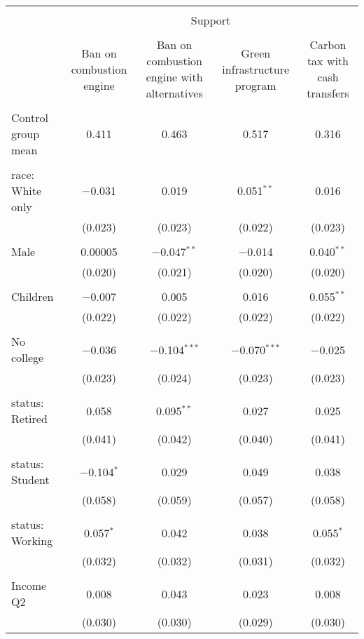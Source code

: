 
\begin{tabular}{@{\extracolsep{5pt}}lcccc} 
\\[-1.8ex]\hline 
\hline \\[-1.8ex] 
 & \multicolumn{4}{c}{Support} \\ 
\cline{2-5} 
\\[-1.8ex] & Ban on combustion engine & Ban on combustion engine with alternatives & Green infrastructure program & Carbon tax with cash transfers \\ 
\hline \\[-1.8ex] 
 Control group mean & 0.411 & 0.463 & 0.517 & 0.316  \\ \hline \\[-1.8ex] race: White only & $-$0.031 & 0.019 & 0.051$^{**}$ & 0.016 \\ 
  & (0.023) & (0.023) & (0.022) & (0.023) \\ 
  & & & & \\ 
 Male & 0.00005 & $-$0.047$^{**}$ & $-$0.014 & 0.040$^{**}$ \\ 
  & (0.020) & (0.021) & (0.020) & (0.020) \\ 
  & & & & \\ 
 Children & $-$0.007 & 0.005 & 0.016 & 0.055$^{**}$ \\ 
  & (0.022) & (0.022) & (0.022) & (0.022) \\ 
  & & & & \\ 
 No college & $-$0.036 & $-$0.104$^{***}$ & $-$0.070$^{***}$ & $-$0.025 \\ 
  & (0.023) & (0.024) & (0.023) & (0.023) \\ 
  & & & & \\ 
 status: Retired & 0.058 & 0.095$^{**}$ & 0.027 & 0.025 \\ 
  & (0.041) & (0.042) & (0.040) & (0.041) \\ 
  & & & & \\ 
 status: Student & $-$0.104$^{*}$ & 0.029 & 0.049 & 0.038 \\ 
  & (0.058) & (0.059) & (0.057) & (0.058) \\ 
  & & & & \\ 
 status: Working & 0.057$^{*}$ & 0.042 & 0.038 & 0.055$^{*}$ \\ 
  & (0.032) & (0.032) & (0.031) & (0.032) \\ 
  & & & & \\ 
 Income Q2 & 0.008 & 0.043 & 0.023 & 0.008 \\ 
  & (0.030) & (0.030) & (0.029) & (0.030) \\ 

\end{tabular}
